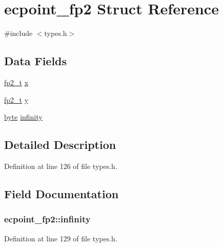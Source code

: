 \hypertarget{structecpoint__fp2}{\section{ecpoint\-\_\-fp2 Struct Reference}
\label{structecpoint__fp2}
}


{\ttfamily \#include $<$types.\-h$>$}

\subsection*{Data Fields}
\begin{DoxyCompactItemize}
\item 
\hyperlink{types_8h_a8d7302536c911390e7ed2a57092e6bf0}{fp2\-\_\-t} \hyperlink{structecpoint__fp2_aa6108d5dc8f23602e749baa8c6869bf7}{x}
\item 
\hyperlink{types_8h_a8d7302536c911390e7ed2a57092e6bf0}{fp2\-\_\-t} \hyperlink{structecpoint__fp2_abde52907800a97b34eb4cd2cae674640}{y}
\item 
\hyperlink{types_8h_a0c8186d9b9b7880309c27230bbb5e69d}{byte} \hyperlink{structecpoint__fp2_aaecf80d4c9b85fef500201ba08aa9f40}{infinity}
\end{DoxyCompactItemize}


\subsection{Detailed Description}


Definition at line 126 of file types.\-h.



\subsection{Field Documentation}
\hypertarget{structecpoint__fp2_aaecf80d4c9b85fef500201ba08aa9f40}{
\subsubsection[{infinity}]{ ecpoint\-\_\-fp2\-::infinity}}\label{structecpoint__fp2_aaecf80d4c9b85fef500201ba08aa9f40}


Definition at line 129 of file types.\-h.



